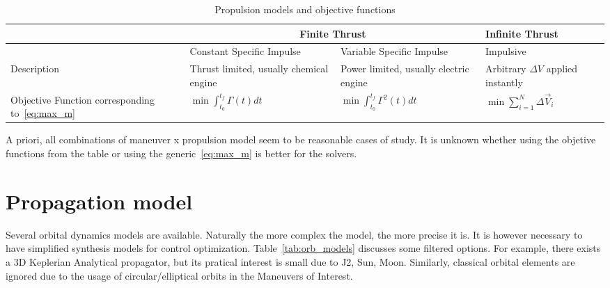 \begin{table}[htpb]
    \centering
    \begin{tabular}{p{3.2cm}p{3.2cm}p{3.2cm}p{3.2cm}} \toprule
        & \multicolumn{2}{c}{\textbf{Finite Thrust}} & \textbf{Infinite Thrust} \\ \midrule
        & Constant Specific Impulse & Variable Specific Impulse & Impulsive \\ \midrule
        Description & Thrust limited, usually chemical engine & Power limited, usually electric engine & Arbitrary \(\Delta V\) applied instantly \\
        Objective Function corresponding to~\eqref{eq:max_m} & \(\min \int_{t_0}^{t_f} \Gamma(t) dt\) & \(\min \int_{t_0}^{t_f} \Gamma^2(t) dt\) & \(\min \sum_{i=1}^N \Delta \vec{V}_i\) \\ \bottomrule
    \end{tabular}
    \caption{Propulsion models and objective functions}\label{tab:prop_models}
\end{table}

A priori, all combinations of maneuver x propulsion model seem to be reasonable cases of study. It is unknown whether using the objetive functions from the table or using the generic~\eqref{eq:max_m} is better for the solvers.

\newpage
\section{Propagation model} %

Several orbital dynamics models are available. Naturally the more complex the model, the more precise it is. It is however necessary to have simplified synthesis models for control optimization. Table~\ref{tab:orb_models} discusses some filtered options. For example, there exists a 3D Keplerian Analytical propagator, but its pratical interest is small due to J2, Sun, Moon. Similarly, classical orbital elements are ignored due to the usage of circular/elliptical orbits in the Maneuvers of Interest.

